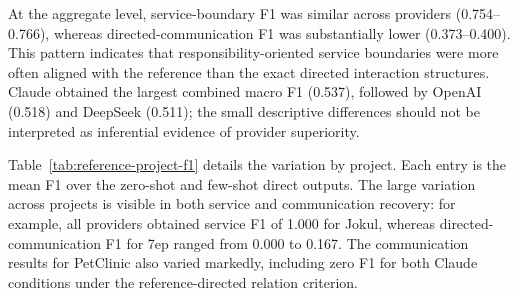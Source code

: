 \documentclass[acmsmall,screen,anonymous,review]{acmart}
\begin{document}
At the aggregate level, service-boundary F1 was similar across providers (0.754--0.766), whereas directed-communication F1 was substantially lower (0.373--0.400). This pattern indicates that responsibility-oriented service boundaries were more often aligned with the reference than the exact directed interaction structures. Claude obtained the largest combined macro F1 (0.537), followed by OpenAI (0.518) and DeepSeek (0.511); the small descriptive differences should not be interpreted as inferential evidence of provider superiority.

Table~\ref{tab:reference-project-f1} details the variation by project. Each entry is the mean F1 over the zero-shot and few-shot direct outputs. The large variation across projects is visible in both service and communication recovery: for example, all providers obtained service F1 of 1.000 for Jokul, whereas directed-communication F1 for 7ep ranged from 0.000 to 0.167. The communication results for PetClinic also varied markedly, including zero F1 for both Claude conditions under the reference-directed relation criterion.

\begin{table}[t]
\centering
\footnotesize
{}
\caption{Reference-aware F1 by project and provider. Each cell is the mean across that provider's zero-shot and few-shot direct outputs. Service and communication F1 use different matching objects; combined F1 pools their decisions.}
\label{tab:reference-project-f1}
\end{table}
\end{document}
